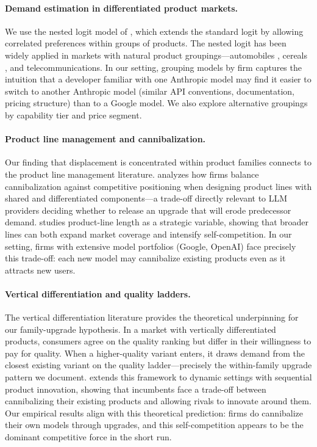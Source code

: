 \documentclass[11pt, a4paper]{article}
\begin{document}
\paragraph{Demand estimation in differentiated product markets.} We use the nested logit model of \citet{berry1994estimating}, which extends the standard logit by allowing correlated preferences within groups of products. The nested logit has been widely applied in markets with natural product groupings---automobiles \citep{berry1995automobile}, cereals \citep{nevo2000practitioners}, and telecommunications. In our setting, grouping models by firm captures the intuition that a developer familiar with one Anthropic model may find it easier to switch to another Anthropic model (similar API conventions, documentation, pricing structure) than to a Google model. We also explore alternative groupings by capability tier and price segment.

\paragraph{Product line management and cannibalization.} Our finding that displacement is concentrated within product families connects to the product line management literature. \citet{desai2001product} analyzes how firms balance cannibalization against competitive positioning when designing product lines with shared and differentiated components---a trade-off directly relevant to LLM providers deciding whether to release an upgrade that will erode predecessor demand. \citet{draganska2005product} studies product-line length as a strategic variable, showing that broader lines can both expand market coverage and intensify self-competition. In our setting, firms with extensive model portfolios (Google, OpenAI) face precisely this trade-off: each new model may cannibalize existing products even as it attracts new users.

\paragraph{Vertical differentiation and quality ladders.} The vertical differentiation literature \citep{shaked1982relaxing, tirole1988theory} provides the theoretical underpinning for our family-upgrade hypothesis. In a market with vertically differentiated products, consumers agree on the quality ranking but differ in their willingness to pay for quality. When a higher-quality variant enters, it draws demand from the closest existing variant on the quality ladder---precisely the within-family upgrade pattern we document. \citet{baron2020vertical} extends this framework to dynamic settings with sequential product innovation, showing that incumbents face a trade-off between cannibalizing their existing products and allowing rivals to innovate around them. Our empirical results align with this theoretical prediction: firms do cannibalize their own models through upgrades, and this self-competition appears to be the dominant competitive force in the short run.
\end{document}
